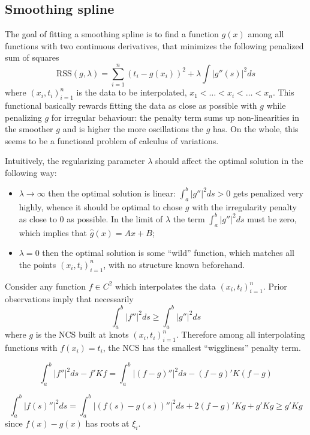 \documentclass[a4paper]{article}
\newcommand{\RSS}{\text{RSS}}
\begin{document}


\subsection{Smoothing spline} %
\label{sub:smoothing_spline}

The goal of fitting a smoothing spline is to find a function $g(x)$ among all functions
with two continuous derivatives, that minimizes the following penalized sum of squares
\[\RSS(g,\lambda) = \sum_{i=1}^n (t_i - g(x_i))^2 + \lambda \int |g''(s)|^2 ds\]
where $(x_i,t_i)_{i=1}^n$ is the data to be interpolated, $x_1<\ldots<x_i<\ldots<x_n$.
This functional basically rewards fitting the data as close as possible with $g$
while penalizing $g$ for irregular behaviour: the penalty term sums up non-linearities
in the smoother $g$ and is higher the more oscillations the $g$ has. On the whole, this
seems to be a functional problem of calculus of variations.

Intuitively, the regularizing parameter $\lambda$ should affect the optimal solution
in the following way: \begin{itemize}
	\item $\lambda\to \infty$ then the optimal solution is linear: $\int_a^b |g''|^2 ds > 0$
	gets penalized very highly, whence it should be optimal to chose $g$ with the
	irregularity penalty as close to $0$ as possible. In the limit of $\lambda$
	the term $\int_a^b |g''|^2 ds$ must be zero, which implies that $\hat{g}(x) = Ax + B$;
	\item $\lambda = 0$ then the optimal solution is some ``wild'' function, which
	matches all the points $(x_i, t_i)_{i=1}^n$, with no structure known beforehand.
\end{itemize}


Consider any function $f\in C^2$ which interpolates the data $(x_i, t_i)_{i=1}^n$.
Prior observations imply that necessarily
\[\int_a^b |f''|^2 ds \geq \int_a^b |g''|^2 ds\]
where $g$ is the NCS built at knots $(x_i, t_i)_{i=1}^n$. Therefore among all
interpolating functions with $f(x_i)=t_i$, the NCS has the smallest ``wiggliness''
penalty term.

\[ \int_a^b |f''|^2 ds - f' K f = \int_a^b |(f-g)''|^2 ds - (f-g)' K (f-g) \]

\[
\int_a^b |f(s)''|^2 ds
= \int_a^b |(f(s)-g(s))''|^2 ds + 2 (f-g)'K g + g'K g
\geq g'K g
\]
since $f(x)-g(x)$ has roots at $\xi_i$.
\end{document}
